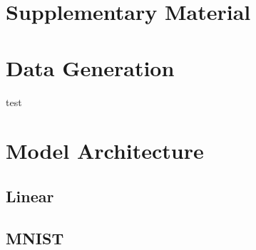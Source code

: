 \section*{Supplementary Material}
\setcounter{section}{0}
\setcounter{figure}{0}
\setcounter{table}{0}
\renewcommand{\thesection}{S\arabic{section}}  
\renewcommand{\thefigure}{S\arabic{figure}}
\renewcommand{\thetable}{S\arabic{table}}  

\section{Data Generation}
test
\section{Model Architecture}
\subsection{Linear}
\subsection{MNIST}
\label{sm:ssec:mnist}

